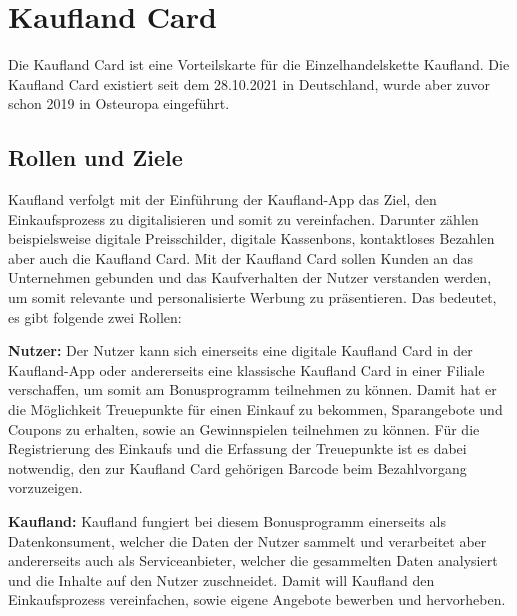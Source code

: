 \section{Kaufland Card}
Die Kaufland Card ist eine Vorteilskarte für die Einzelhandelskette Kaufland. Die Kaufland Card existiert seit dem 28.10.2021 in Deutschland, wurde aber zuvor schon 2019 in Osteuropa eingeführt.

\subsection{Rollen und Ziele}
Kaufland verfolgt mit der Einführung der Kaufland-App das Ziel, den Einkaufsprozess zu digitalisieren und somit zu vereinfachen. Darunter zählen beispielsweise digitale Preisschilder, digitale Kassenbons, kontaktloses Bezahlen aber auch die Kaufland Card. \cite{Kaufland_Ziele} Mit der Kaufland Card sollen Kunden an das Unternehmen gebunden und das Kaufverhalten der Nutzer verstanden werden, um somit relevante und personalisierte Werbung zu präsentieren. \cite{Kaufland_Datenschutz} Das bedeutet, es gibt folgende zwei Rollen: \newline

\noindent \textbf{Nutzer:} Der Nutzer kann sich einerseits eine digitale Kaufland Card in der Kaufland-App oder andererseits eine klassische Kaufland Card in einer Filiale verschaffen, um somit am Bonusprogramm teilnehmen zu können. Damit hat er die Möglichkeit Treuepunkte für einen Einkauf zu bekommen, Sparangebote und Coupons zu erhalten, sowie an Gewinnspielen teilnehmen zu können. Für die Registrierung des Einkaufs und die Erfassung der Treuepunkte ist es dabei notwendig, den zur Kaufland Card gehörigen Barcode beim Bezahlvorgang vorzuzeigen. \newline

\noindent \textbf{Kaufland:} Kaufland fungiert bei diesem Bonusprogramm einerseits als Datenkonsument, welcher die Daten der Nutzer sammelt und verarbeitet aber andererseits auch als Serviceanbieter, welcher die gesammelten Daten analysiert und die Inhalte auf den Nutzer zuschneidet. Damit will Kaufland den Einkaufsprozess vereinfachen, sowie eigene Angebote bewerben und hervorheben.

